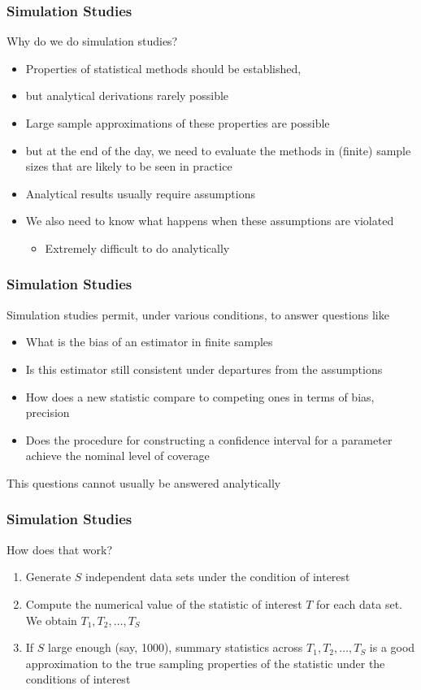 \documentclass[paper=screen,mathserif]{beamer}\usepackage[]{graphicx}\usepackage[]{color}
\begin{document}
\begin{frame}
  \frametitle{Simulation Studies}
  Why do we do simulation studies?
  \begin{itemize}
  \item Properties of statistical methods should be established,
  \item but analytical derivations rarely possible
  \item Large sample approximations of these properties are possible
  \item but at the end of the day, we need to evaluate the methods in
    (finite) sample sizes that are likely to be seen in practice
  \item Analytical results usually require assumptions
  \item We also need to know what happens when these assumptions are
    violated
    \begin{itemize}
    \item Extremely difficult to do analytically
    \end{itemize}
  \end{itemize}
\end{frame}

\begin{frame}
  \frametitle{Simulation Studies} Simulation studies permit, under
  various conditions, to answer questions like
  \begin{itemize}
  \item What is the bias of an estimator in finite samples
  \item Is this estimator still consistent under departures from the
    assumptions
  \item How does a new statistic compare to competing ones in terms of
    bias, precision
  \item Does the procedure for constructing a confidence interval for
    a parameter achieve the nominal level of coverage
  \end{itemize}
This questions cannot usually be answered analytically
\end{frame}

\begin{frame}
  \frametitle{Simulation Studies}
How does that work?
\begin{enumerate}
\item Generate $S$ independent data sets under the condition of interest
\item Compute the numerical value of the statistic of interest $T$ for
  each data set. We obtain $T_1, T_2, \dots, T_S$
\item If $S$ large enough (say, 1000), summary statistics across $T_1,
  T_2, \dots, T_S$ is a good approximation to the true sampling
  properties of the statistic under the conditions of interest
\end{enumerate}
\end{frame}
\end{document}
